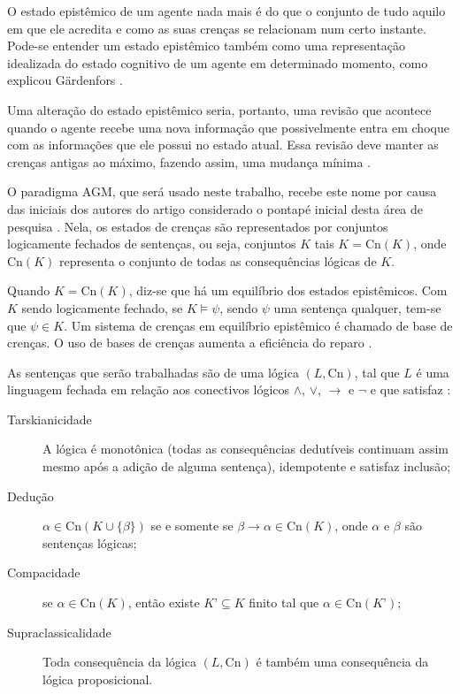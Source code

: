O estado epistêmico de um agente nada mais é do que o conjunto de tudo aquilo em que ele acredita e como as suas crenças se relacionam num certo instante. Pode-se entender um estado epistêmico também como uma representação idealizada do estado cognitivo de um agente em determinado momento, como explicou Gärdenfors \citep{revisaoGardenfors}.

Uma alteração do estado epistêmico seria, portanto, uma revisão que acontece quando o agente recebe uma nova informação que possivelmente entra em choque com as informações que ele possui no estado atual. Essa revisão deve manter as crenças antigas ao máximo, fazendo assim, uma mudança mínima \citep{logicaResina}.

O paradigma AGM, que será usado neste trabalho, recebe este nome por causa das iniciais dos autores do artigo considerado o pontapé inicial desta área de pesquisa  \citep{revisaoAGM}. Nela, os estados de crenças são representados por conjuntos logicamente fechados de sentenças, ou seja, conjuntos $ K $ tais $ K = \text{Cn}(K) $, onde $ \text{Cn}(K) $ representa o conjunto de todas as consequências lógicas de $ K $. 

Quando $ K = \text{Cn}(K) $, diz-se que há um equilíbrio dos estados epistêmicos. Com $ K $ sendo logicamente fechado, se $ K \models \psi $, sendo $ \psi $ uma sentença qualquer, tem-se que $ \psi \in K $. Um sistema de crenças em equilíbrio epistêmico é chamado de base de crenças.  O uso de bases de crenças aumenta a eficiência do reparo  \citep{revisaoHansson}.

As sentenças que serão trabalhadas são de uma lógica $ (L, \text{Cn}) $, tal que $ L $ é uma linguagem fechada em relação aos conectivos lógicos $ \land $, $ \lor $, $ \to $ e $ \lnot $ e que satisfaz \citep{revisaoRibeiro}:

\begin{description}
	\item[Tarskianicidade] A lógica é monotônica (todas as consequências dedutíveis continuam assim mesmo após a adição de alguma sentença), idempotente e satisfaz inclusão;
	\item[Dedução] $ \alpha \in \text{Cn}(K \cup \{\beta\}) $ se e somente se $ \beta \to \alpha \in \text{Cn}(K) $, onde $ \alpha $ e $ \beta $ são sentenças lógicas;
	\item[Compacidade] se $ \alpha \in \text{Cn}(K) $, então existe $ K’ \subseteq K $ finito tal que $ \alpha \in \text{Cn}(K’) $;
	\item[Supraclassicalidade] Toda consequência da lógica $ (L, \text{Cn}) $ é também uma consequência da lógica proposicional.
\end{description} 

